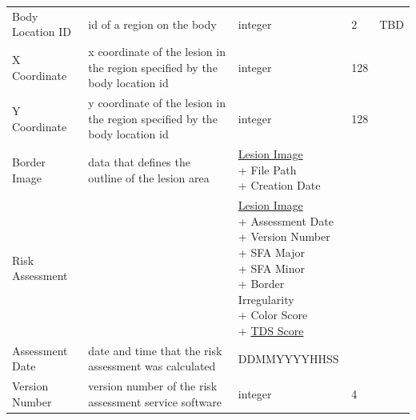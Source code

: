 \begin{longtable}[H]{ | l | p{3.0cm} | p{2.5cm} | p{1.0cm} | p{2.5cm} | }
                     & & \\ \hline


                    Body Location ID & id of a region on the body &
                    integer & 2 & TBD \\ \hline

                    X Coordinate & x coordinate of the lesion in the region specified by the body location id &
                    integer & 128 &  \\ \hline

                    Y Coordinate & y coordinate of the lesion in the region specified by the body location id &
                    integer & 128 &  \\ \hline

                    Border Image & data that defines the outline of the lesion area &

                        \specialcell[t]{\hyperlink{lesion_image}{Lesion Image}
                           \\ + File Path
                           \\ + Creation Date
                        }

                     & & \\ \hline

                    Risk Assessment &  &

                        \specialcell[t]{\hyperlink{lesion_image}{Lesion Image}
                            \\ + Assessment Date
                            \\ + Version Number
                            \\ + SFA Major
                            \\ + SFA Minor
                            \\ + Border Irregularity
                            \\ + Color Score
                            \\ + \hyperlink{tds_score}{TDS Score}
                        }

                    & & \\ \hline

                    Assessment Date & date and time that the risk assessment was calculated &
                    DDMMYYYYHHSS &  &  \\ \hline

                    Version Number & version number of the risk assessment service software &
                    integer & 4 &  \\ \hline


\end{longtable}

